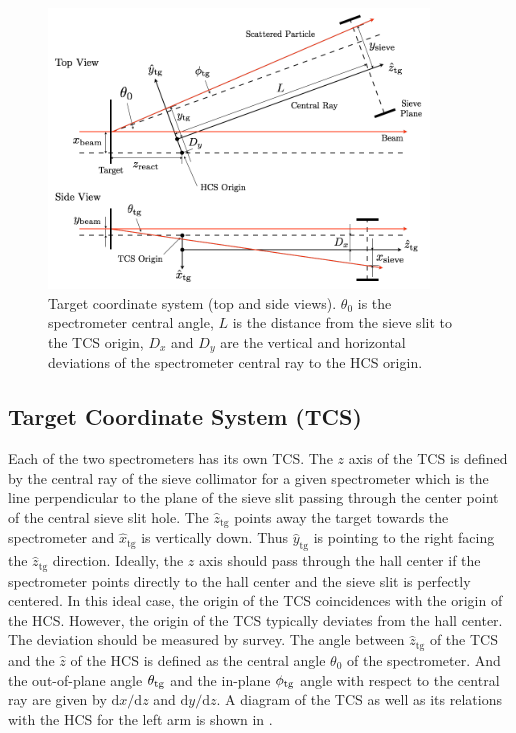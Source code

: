 \begin{figure}[p!]
  \centering
  \includegraphics[width=0.9\textwidth]{figs/TCS.png}
  \caption[Target coordinate system.]{Target coordinate system (top and side views). $\theta_0$ is the spectrometer central angle, $L$ is the distance from the sieve slit to the TCS origin, $D_x$ and $D_y$ are the vertical and horizontal deviations of the spectrometer central ray to the HCS origin. \label{C6S1F2}}
\end{figure}

\subsection[Target Coordinate System]{Target Coordinate System (TCS)}
\label{C6S1SS2}

Each of the two spectrometers has its own TCS. The $z$ axis of the TCS is defined by the central ray of the sieve collimator for a given spectrometer which is the line perpendicular to the plane of the sieve slit passing through the center point of the central sieve slit hole. The $\hat{z}_{\mathrm{tg}}$ points away the target towards the spectrometer and $\hat{x}_{\mathrm{tg}}$ is vertically down. Thus $\hat{y}_{\mathrm{tg}}$ is pointing to the right facing the $\hat{z}_{\mathrm{tg}}$ direction. Ideally, the $z$ axis should pass through the hall center if the spectrometer points directly to the hall center and the sieve slit is perfectly centered. In this ideal case, the origin of the TCS coincidences with the origin of the HCS. However, the origin of the TCS typically deviates from the hall center. The deviation should be measured by survey. The angle between $\hat{z}_{\mathrm{tg}}$ of the TCS and the $\hat{z}$ of the HCS is defined as the central angle $\theta_0$ of the spectrometer. And the out-of-plane angle $\theta_{\mathrm{tg}}$ and the in-plane $\phi_{\mathrm{tg}}$ angle with respect to the central ray are given by $\mathrm{d}x/\mathrm{d}z$ and $\mathrm{d}y/\mathrm{d}z$. A diagram of the TCS as well as its relations with the HCS for the left arm is shown in .

